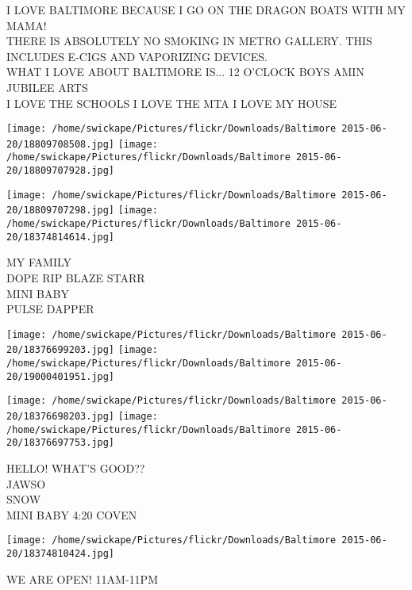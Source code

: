 \documentclass[10pt,letterpaper]{article}
\begin{document}
I LOVE BALTIMORE BECAUSE I GO ON THE DRAGON BOATS WITH MY MAMA!\\
THERE IS ABSOLUTELY NO SMOKING IN METRO GALLERY.  THIS INCLUDES E{-}CIGS AND VAPORIZING DEVICES.\\
WHAT I LOVE ABOUT BALTIMORE IS... 12 O'CLOCK BOYS AMIN JUBILEE ARTS\\
I LOVE THE SCHOOLS I LOVE THE MTA I LOVE MY HOUSE\\
\pagebreak

\texttt{[image: /home/swickape/Pictures/flickr/Downloads/Baltimore 2015-06-20/18809708508.jpg]}
\texttt{[image: /home/swickape/Pictures/flickr/Downloads/Baltimore 2015-06-20/18809707928.jpg]}

\texttt{[image: /home/swickape/Pictures/flickr/Downloads/Baltimore 2015-06-20/18809707298.jpg]}
\texttt{[image: /home/swickape/Pictures/flickr/Downloads/Baltimore 2015-06-20/18374814614.jpg]}

MY FAMILY\\
DOPE RIP BLAZE STARR\\
MINI BABY\\
PULSE DAPPER\\
\pagebreak

\texttt{[image: /home/swickape/Pictures/flickr/Downloads/Baltimore 2015-06-20/18376699203.jpg]}
\texttt{[image: /home/swickape/Pictures/flickr/Downloads/Baltimore 2015-06-20/19000401951.jpg]}

\texttt{[image: /home/swickape/Pictures/flickr/Downloads/Baltimore 2015-06-20/18376698203.jpg]}
\texttt{[image: /home/swickape/Pictures/flickr/Downloads/Baltimore 2015-06-20/18376697753.jpg]}

HELLO!  WHAT'S GOOD??\\
JAWSO\\
SNOW\\
MINI BABY 4:20 COVEN\\
\pagebreak

\texttt{[image: /home/swickape/Pictures/flickr/Downloads/Baltimore 2015-06-20/18374810424.jpg]}

WE ARE OPEN!  11AM{-}11PM\\
\pagebreak
\end{document}

